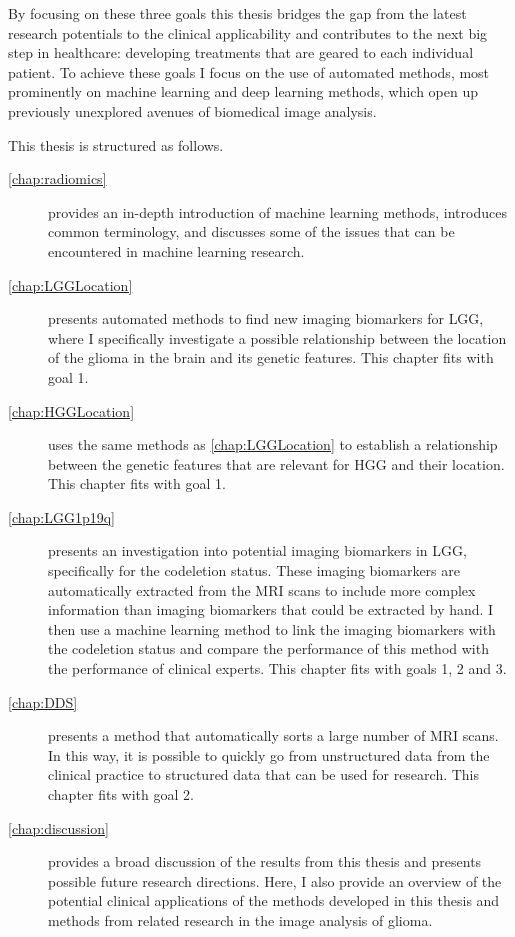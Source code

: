 By focusing on these three goals this thesis bridges the gap from the latest research potentials to the clinical applicability and contributes to the next big step in healthcare: developing treatments that are geared to each individual patient.
To achieve these goals I focus on the use of automated methods, most prominently on machine learning and deep learning methods, which open up previously unexplored avenues of biomedical image analysis.

This thesis is structured as follows.

\begin{description}
    \item[\cref{chap:radiomics}] provides an in-depth introduction of machine learning methods, introduces common terminology, and discusses some of the issues that can be encountered in machine learning research.

    \item[\cref{chap:LGGLocation}] presents automated methods to find new imaging biomarkers for \gls{LGG}, where I specifically investigate a possible relationship between the location of the \gls{glioma} in the brain and its genetic features.
    This chapter fits with goal 1.

    \item[\cref{chap:HGGLocation}] uses the same methods as \cref{chap:LGGLocation} to establish a relationship between the genetic features that are relevant for \gls{HGG} and their location.
    This chapter fits with goal 1.

    \item[\cref{chap:LGG1p19q}] presents an investigation into potential imaging biomarkers in \gls{LGG}, specifically for the \gls{codeletion} status.
    These imaging biomarkers are automatically extracted from the \gls{MRI} scans to include more complex information than imaging biomarkers that could be extracted by hand.
    I then use a machine learning method to link the imaging biomarkers with the \gls{codeletion} status and compare the performance of this method with the performance of clinical experts.
    This chapter fits with goals 1, 2 and 3.

    \item[\cref{chap:DDS}] presents a method that automatically sorts a large number of \gls{MRI} scans.
    In this way, it is possible to quickly go from unstructured data from the clinical practice to structured data that can be used for research.
    This chapter fits with goal 2.

    \item[\cref{chap:discussion}] provides a broad discussion of the results from this thesis and presents possible future research directions.
    Here, I also provide an overview of the potential clinical applications of the methods developed in this thesis and methods from related research in the image analysis of glioma.

\end{description}


